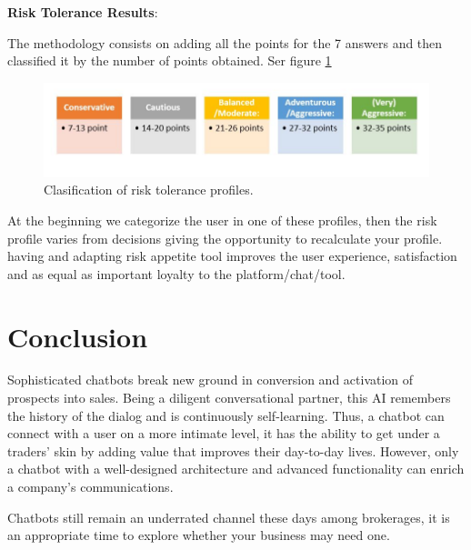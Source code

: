 \documentclass[	DIV=calc,%
							paper=letter,%
							fontsize=12pt%
                            ]{scrartcl}	 					%
\begin{document}
\textbf{Risk Tolerance Results}:

The methodology consists on adding all the points for the 7 answers and then classified it by the number of points obtained. Ser figure \ref{RiskTolerance} 

\begin{figure}[H]
\centering
\includegraphics[scale=0.8]{img/Risk.JPG}
\caption{Clasification of risk tolerance profiles. \cite{currentreport_risktolerancequest}}
\label{RiskTolerance}
\end{figure}


At the beginning we categorize the user in one of these profiles, then the risk profile varies from decisions giving the opportunity to recalculate your profile. having and adapting risk appetite tool improves the user experience, satisfaction and as equal as  important loyalty to the platform/chat/tool.


\section{\label{sec:level1}Conclusion}
Sophisticated chatbots break new ground in conversion and activation of prospects into sales. Being a diligent conversational partner, this AI remembers the history of the dialog and is continuously self-learning. Thus, a chatbot can connect with a user on a more intimate level, it has the ability to get under a traders’ skin by adding value that improves their day-to-day lives. However, only a chatbot with a well-designed architecture and advanced functionality can enrich a company’s communications. 

Chatbots still remain an underrated channel these days among brokerages, it is an appropriate time to explore whether your business may need one.
\newpage


\end{document}
